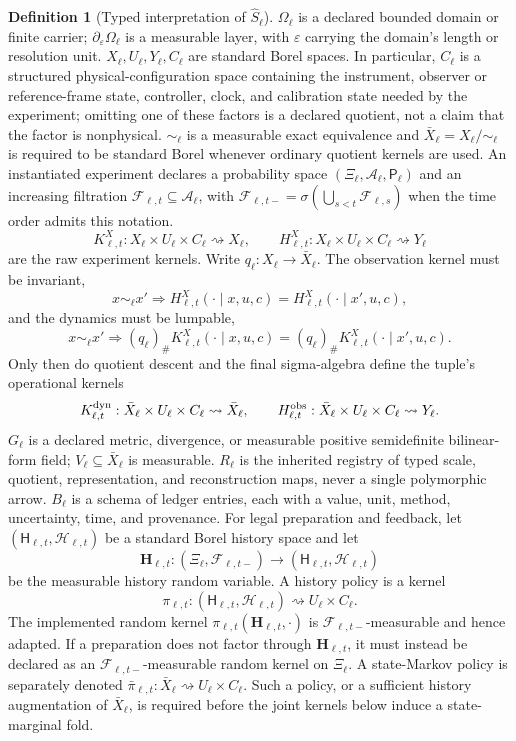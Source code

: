 \documentclass[11pt,a4paper]{article}
\theoremstyle{definition}
\newtheorem{definition}{Definition}[section]
\theoremstyle{plain}
\theoremstyle{remark}
\newcommand{\Prob}{\mathsf P}
\begin{document}
\begin{definition}[Typed interpretation of \(\widehat S_\ell\)]
\(\Omega_\ell\) is a declared bounded domain or finite carrier;
\(\partial_\varepsilon\Omega_\ell\) is a measurable layer, with
\(\varepsilon\) carrying the domain's length or resolution unit.
\(X_\ell,U_\ell,Y_\ell,C_\ell\) are standard Borel spaces.  In particular,
\(C_\ell\) is a structured physical-configuration space containing the
instrument, observer or reference-frame state, controller, clock, and
calibration state needed by the experiment; omitting one of these factors is
a declared quotient, not a claim that the factor is nonphysical.
\(\sim_\ell\) is a measurable exact equivalence and
\(\bar X_\ell=X_\ell/{\sim_\ell}\) is required to be standard Borel whenever
ordinary quotient kernels are used.
An instantiated experiment declares a probability space
\((\Xi_\ell,\mathcal A_\ell,\Prob_\ell)\) and an increasing filtration
\(\mathcal F_{\ell,t}\subseteq\mathcal A_\ell\), with
\(\mathcal F_{\ell,t-}=\sigma(\bigcup_{s<t}\mathcal F_{\ell,s})\) when the
time order admits this notation.
\[
K_{\ell,t}^{X}:X_\ell\times U_\ell\times C_\ell\rightsquigarrow X_\ell,
\qquad
H_{\ell,t}^{X}:X_\ell\times U_\ell\times C_\ell\rightsquigarrow Y_\ell
\]
are the raw experiment kernels.  Write \(q_\ell:X_\ell\to\bar X_\ell\).
The observation kernel must be invariant,
\[
x\sim_\ell x'\Longrightarrow
H_{\ell,t}^{X}(\cdot\mid x,u,c)
=H_{\ell,t}^{X}(\cdot\mid x',u,c),
\]
and the dynamics must be lumpable,
\[
x\sim_\ell x'\Longrightarrow
(q_\ell)_\#K_{\ell,t}^{X}(\cdot\mid x,u,c)
=(q_\ell)_\#K_{\ell,t}^{X}(\cdot\mid x',u,c).
\]
Only then do quotient descent and the final sigma-algebra define the tuple's
operational kernels
\[
K_{\ell,t}^{\rm dyn}:\bar X_\ell\times U_\ell\times C_\ell
\rightsquigarrow\bar X_\ell,\qquad
H_{\ell,t}^{\rm obs}:\bar X_\ell\times U_\ell\times C_\ell
\rightsquigarrow Y_\ell .
\]
\(G_\ell\) is a declared metric, divergence, or measurable positive
semidefinite bilinear-form field; \(V_\ell\subseteq\bar X_\ell\) is measurable.
\(R_\ell\) is the inherited registry of typed scale, quotient,
representation, and reconstruction maps, never a single polymorphic arrow.
\(B_\ell\) is a schema of ledger entries, each with a value, unit, method,
uncertainty, time, and provenance.
For legal preparation and feedback, let
\((\mathsf H_{\ell,t},\mathscr H_{\ell,t})\) be a standard Borel history
space and let
\[
\mathbf H_{\ell,t}:(\Xi_\ell,\mathcal F_{\ell,t-})
\longrightarrow(\mathsf H_{\ell,t},\mathscr H_{\ell,t})
\]
be the measurable history random variable.  A history policy is a kernel
\[
\pi_{\ell,t}:
(\mathsf H_{\ell,t},\mathscr H_{\ell,t})
\rightsquigarrow U_\ell\times C_\ell .
\]
The implemented random kernel
\(\pi_{\ell,t}(\mathbf H_{\ell,t},\cdot)\) is
\(\mathcal F_{\ell,t-}\)-measurable and hence adapted.  If a preparation does
not factor through \(\mathbf H_{\ell,t}\), it must instead be declared as an
\(\mathcal F_{\ell,t-}\)-measurable random kernel on \(\Xi_\ell\).  A
state-Markov policy is separately denoted
\(\bar\pi_{\ell,t}:\bar X_\ell\rightsquigarrow U_\ell\times C_\ell\).
Such a policy, or a sufficient history augmentation of \(\bar X_\ell\), is
required before the joint kernels below induce a state-marginal fold.
\end{definition}
\end{document}
